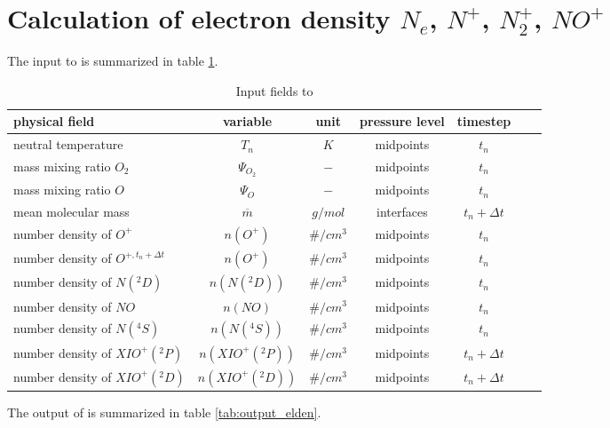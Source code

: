 %
\section{Calculation of electron density $N_e$, $N^+$, $N_2^+$, $NO^+$  }\label{cap:elden}
%
The input to  is summarized in table
\ref{tab:input_elden}.
%
\begin{table}[tb]
\begin{tabular}{|p{3.5cm} ||c|c|c|c|c|c|} \hline
physical field               & variable        & unit&pressure
level& timestep
\\ \hline \hline
%
neutral temperature &       $T_n$              & $K$   &  midpoints & $t_n$\\
mass mixing ratio $O_2$&       {$\Psi_{O_2}$}     & $-$   & midpoints  & $t_n$\\
mass mixing ratio $O$&       {$\Psi_{O}$}     & $-$   &  midpoints & $t_n$\\
mean molecular mass&       {$\overline{m}$}     & $g/mol$   & interfaces  &$t_n + \Delta t$ \\
number density of $O^+$&   $n(O^+)$         & $\#/cm^3$   & midpoints  &$t_n $ \\
number density of $O^{+,t_n+\Delta t}$&   $n(O^+)$         & $\#/cm^3$   & midpoints  &$t_n $ \\
number density of $N(^2D)$&   $n(N(^2D))$  & $\#/cm^3$   & midpoints  &$t_n$ \\
number density of $NO$&   $n(NO)$  & $\#/cm^3$   & midpoints  &$t_n$ \\
number density of $N(^4S)$&   $n(N(^4S))$  & $\#/cm^3$   & midpoints  &$t_n$ \\
number density of $XI O^+(^2P)$&   $n(XI O^+(^2P))$  & $\#/cm^3$   & midpoints  &$t_n+ \Delta t$ \\
number density of $XI O^+(^2D)$&   $n(XI O^+(^2D))$  & $\#/cm^3$   &
midpoints &$t_n+ \Delta t$
 \\ \hline
\end{tabular}
\caption{Input fields to }
\label{tab:input_elden}
\end{table}
%
The output of  is summarized in table
\ref{tab:output_elden}.
%
